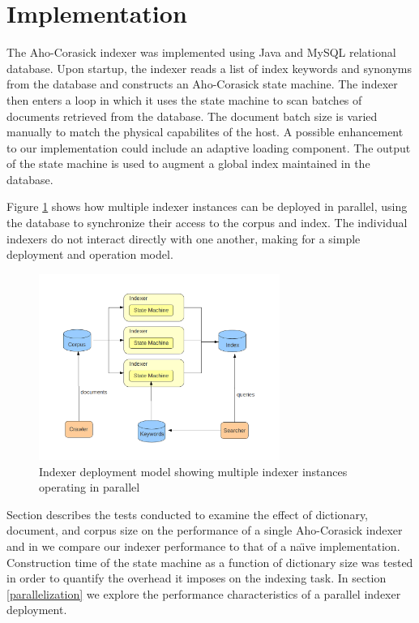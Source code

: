 \documentclass[10pt]{article}
\begin{document}
\section{Implementation}
\label{sec:implementation}
The Aho-Corasick indexer was implemented using Java and MySQL
relational database. Upon startup, the indexer reads a list of index
keywords and synonyms from the database and constructs an Aho-Corasick
state machine. The indexer then enters a loop in which it uses the
state machine to scan batches of documents retrieved from the
database. The document batch size is varied manually to match the
physical capabilites of the host. A possible enhancement to our
implementation could include an adaptive loading component. The output
of the state machine is used to augment a global index maintained in
the database.

Figure \ref{fig:deploymentmodel} shows how multiple indexer instances
can be deployed in parallel, using the database to synchronize their
access to the corpus and index. The individual indexers do not
interact directly with one another, making for a simple deployment and
operation model.


\begin{figure}
  \begin{center}
        \includegraphics[width=0.70\textwidth,height=!]{deploymentmodel}
  \end{center}
  \caption{Indexer deployment model showing multiple indexer instances
  operating in parallel}
  \label{fig:deploymentmodel}
\end{figure} 

Section \label{sec:experimentresults} describes the tests conducted to
examine the effect of dictionary, document, and corpus size on the
performance of a single Aho-Corasick indexer and in \label{sec:naive}
we compare our indexer performance to that of a na\"{\i}ve
implementation. Construction time of the state machine as a function
of dictionary size was tested in order to quantify the overhead it
imposes on the indexing task. In section \ref{parallelization} we
explore the performance characteristics of a parallel indexer
deployment.
\end{document}
